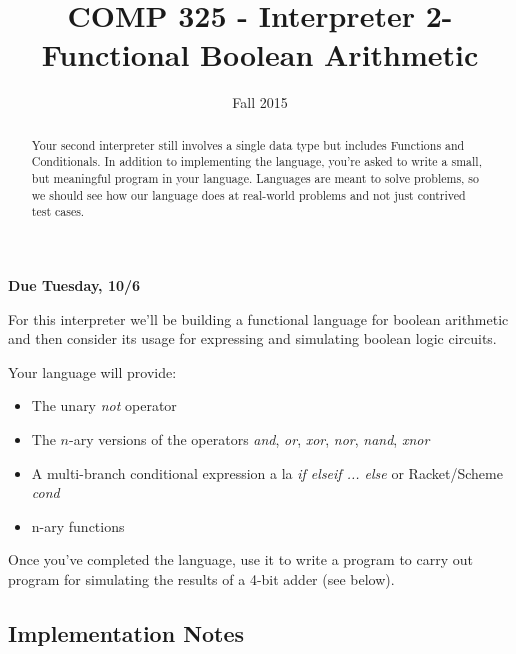 \documentclass[10pt]{article}
\title{COMP 325 - Interpreter 2- Functional Boolean Arithmetic}
\author{  }
\date{Fall 2015}
\begin{document}
\maketitle

\begin{abstract}
Your second interpreter still involves a single data type but includes Functions and Conditionals.  In addition to implementing the language, you're asked to write a small, but meaningful program in your language. Languages are meant to solve problems, so we should see how our language does at real-world problems and not just contrived test cases.
\end{abstract}

\begin{center}
\textbf{Due Tuesday, 10/6}
\end{center}

For this interpreter we'll be building a functional language for boolean arithmetic and then consider its usage for expressing and simulating boolean logic circuits. 

Your language will provide:
\begin{itemize}
\item The unary \textit{not} operator
\item The $n$-ary versions of the operators \textit{and}, \textit{or}, \textit{xor}, \textit{nor}, \textit{nand}, \textit{xnor}
\item A multi-branch conditional expression a la \textit{if elseif ... else} or Racket/Scheme \textit{cond}
\item n-ary functions 
\end{itemize}

Once you've completed the language, use it to write a program to carry out program for simulating the results of a 4-bit adder (see below).

\subsection{Implementation Notes}
\end{document}
